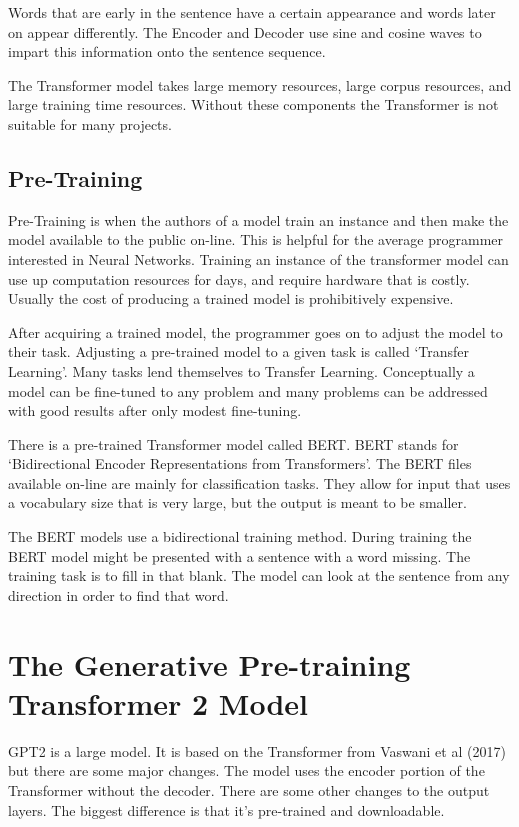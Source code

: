 Words that are early in the sentence have a certain appearance and words later on appear differently. The Encoder and Decoder use sine and cosine waves to impart this information onto the sentence sequence. 

The Transformer model takes large memory resources, large corpus resources, and large training time resources. Without these components the Transformer is not suitable for many projects.

\subsection*{Pre-Training}
Pre-Training is when the authors of a model train an instance and then make the model available to the public on-line. This is helpful for the average programmer interested in Neural Networks. Training an instance of the transformer model can use up computation resources for days, and require hardware that is costly. Usually the cost of producing a trained model is prohibitively expensive.

After acquiring a trained model, the programmer goes on to adjust the model to their task. Adjusting a pre-trained model to a given task is called `Transfer Learning'. Many tasks lend themselves to Transfer Learning. Conceptually a model can be fine-tuned to any problem and many problems can be addressed with good results after only modest fine-tuning.

There is a pre-trained Transformer model called \ac{BERT}. BERT stands for `Bidirectional Encoder Representations from Transformers'. The BERT files available on-line are mainly for classification tasks. They allow for input that uses a vocabulary size that is very large, but the output is meant to be smaller.

The BERT models use a bidirectional training method. During training the BERT model might be presented with a sentence with a word missing. The training task is to fill in that blank. The model can look at the sentence from any direction in order to find that word.

\section{The Generative Pre-training Transformer 2 Model}

\ac{GPT2} is a large model. It is based on the Transformer from Vaswani et al (2017)\cite{Vaswani2017AttentionIA} but there are some major changes. The model uses the encoder portion of the Transformer without the decoder. There are some other changes to the output layers. The biggest difference is that it's pre-trained and downloadable.

